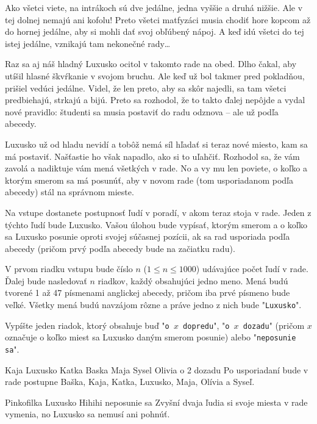 




Ako všetci viete, na intrákoch sú dve jedálne, jedna vyššie a druhá nižšie.
Ale v tej dolnej nemajú ani kofolu! Preto všetci matfyzáci musia chodiť hore kopcom až
do hornej jedálne, aby si mohli dať svoj obľúbený nápoj. A keď idú všetci do tej
istej jedálne, vznikajú tam nekonečné rady\dots

Raz sa aj náš hladný Luxusko ocitol v takomto rade na obed. Dlho čakal, aby utíšil
hlasné škvŕkanie v svojom bruchu. Ale keď už bol takmer pred pokladňou, prišiel vedúci jedálne.
Videl, že len preto, aby sa skôr najedli, sa tam všetci predbiehajú, strkajú a bijú.
Preto sa rozhodol, že to takto ďalej nepôjde a vydal nové pravidlo:
študenti sa musia postaviť do radu odznova -- ale už podľa abecedy.

Luxusko už od hladu nevidí a tobôž nemá síl hľadať si teraz nové miesto,
kam sa má postaviť. Našťastie ho však napadlo, ako si to uľahčiť. Rozhodol sa, že
vám zavolá a nadiktuje vám mená všetkých v rade. No a vy mu len poviete, o koľko a ktorým smerom sa má
posunúť, aby v novom rade (tom usporiadanom podľa abecedy) stál na správnom mieste.


Na vstupe dostanete postupnosť ľudí v poradí, v akom teraz stoja v rade.
Jeden z týchto ľudí bude Luxusko. Vašou úlohou bude vypísať, ktorým smerom a o
koľko sa Luxusko posunie oproti svojej súčasnej pozícii, ak sa rad usporiada
podľa abecedy (pričom prvý podľa abecedy bude na začiatku radu).


V prvom riadku vstupu bude číslo $n$ ($1\leq n\leq 1000$) udávajúce počet ľudí v
rade. Ďalej bude nasledovať $n$ riadkov, každý obsahujúci jedno meno.
Mená budú tvorené 1 až 47 písmenami anglickej abecedy, pričom iba prvé písmeno
bude veľké. Všetky mená budú navzájom rôzne a práve jedno z nich bude "\texttt{Luxusko}".


Vypíšte jeden riadok, ktorý obsahuje buď "\texttt{o $x$ dopredu}", "\texttt{o
$x$ dozadu}" (pričom $x$ označuje o koľko miest sa Luxusko daným smerom posunie) alebo
"\texttt{neposunie sa}".


Kaja
Luxusko
Katka
Baska
Maja
Sysel
Olivia
\vystup
o 2 dozadu
\komentar
Po usporiadaní bude v rade postupne Baška, Kaja, Katka, Luxusko, Maja, Olívia a Syseľ.
\koniec

Pinkofilka
Luxusko
Hihihi
\vystup
neposunie sa
\komentar
Zvyšní dvaja ľudia si svoje miesta v rade vymenia, no Luxusko sa nemusí ani pohnúť.
\koniec


